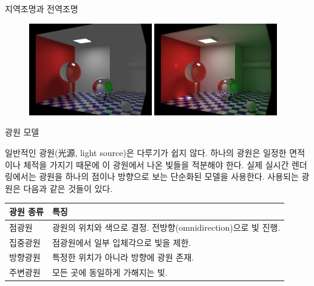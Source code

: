 \begin{frame}[fragile]{지역조명과 전역조명}

\begin{figure}[h!]
  \centering
    \includegraphics[height=4cm]{Math_lighting/local_illumination.jpg}
    \includegraphics[height=4cm]{Math_lighting/global_illumination.jpg}
\end{figure}

\end{frame}


\begin{frame}[fragile]{광원 모델}

일반적인 광원(光源, light source)은 다루기가 쉽지 않다. 하나의 광원은 일정한 면적이나 체적을 가지기 때문에 이 광원에서 나온 빛들을 적분해야 한다.
실제 실시간 렌더링에서는 광원을 하나의 점이나 방향으로 보는 단순화된 모델을 사용한다. 사용되는 광원은 다음과 같은 것들이 있다.

\begin{center}
    \begin{tabular}{ |l| p{12cm} |}
    \hline
    {\small \sf \bf 광원 종류} & {\small \sf \bf 특징} \\ \hline
    {\small \sf 점광원} & {\small \sf 광원의 위치와 색으로 결정. 전방향(omnidirection)으로 빛 진행.}\\ \hline
    {\small \sf 집중광원 } & {\small \sf 점광원에서 일부 입체각으로 빛을 제한.}\\ \hline
    {\small \sf 방향광원 } & {\small \sf 특정한 위치가 아니라 방향에 광원 존재.} \\ \hline
    {\small \sf 주변광원 } & {\small \sf 모든 곳에 동일하게 가해지는 빛.}\\ \hline
    \end{tabular}
\end{center}

\end{frame}


